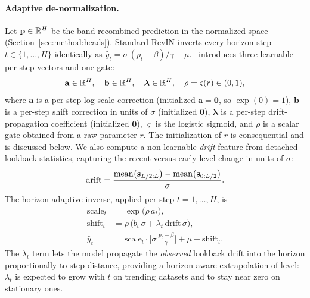 \paragraph{Adaptive de-normalization.}
Let $\mathbf{p} \in \mathbb{R}^{H}$ be the band-recombined prediction in the normalized space
(Section~\ref{sec:method:heads}). Standard RevIN inverts every horizon step
$t \in \{1,\dots,H\}$ identically as
$\hat{y}_t = \sigma\,(p_t - \beta)/\gamma + \mu$. \arevin\ introduces three
learnable per-step vectors and one gate:
\begin{equation}
\mathbf{a} \in \mathbb{R}^{H},\quad
\mathbf{b} \in \mathbb{R}^{H},\quad
\boldsymbol{\lambda} \in \mathbb{R}^{H},\quad
\rho = \varsigma(r) \in (0,1),
\label{eq:arevin-params}
\end{equation}
where $\mathbf{a}$ is a per-step log-scale correction (initialized
$\mathbf{a}{=}\mathbf{0}$, so $\exp(0){=}1$), $\mathbf{b}$ is a per-step shift
correction in units of $\sigma$ (initialized $\mathbf{0}$),
$\boldsymbol{\lambda}$ is a per-step drift-propagation coefficient (initialized
$\mathbf{0}$), $\varsigma$ is the logistic sigmoid, and $\rho$ is a scalar gate
obtained from a raw parameter $r$. The initialization of $r$ is consequential and
is discussed below. We also compute a non-learnable \emph{drift} feature from
detached lookback statistics, capturing the recent-versus-early level change in
units of $\sigma$:
\begin{equation}
\mathrm{drift} =
\frac{\operatorname{mean}\!\big(\mathbf{s}_{L/2:L}\big)
      - \operatorname{mean}\!\big(\mathbf{s}_{0:L/2}\big)}{\sigma}.
\label{eq:drift}
\end{equation}
The horizon-adaptive inverse, applied per step $t = 1,\dots,H$, is
\begin{align}
\mathrm{scale}_t &= \exp\!\big(\rho\, a_t\big), \label{eq:arevin-scale}\\
\mathrm{shift}_t &= \rho\,\big(b_t\,\sigma + \lambda_t\,\mathrm{drift}\,\sigma\big),
  \label{eq:arevin-shift}\\
\hat{y}_t &= \mathrm{scale}_t \cdot
  \Big[\sigma\,\frac{p_t - \beta}{\gamma}\Big] + \mu + \mathrm{shift}_t.
  \label{eq:arevin-denorm}
\end{align}
The $\lambda_t$ term lets the model propagate the \emph{observed} lookback drift
into the horizon proportionally to step distance, providing a horizon-aware
extrapolation of level: $\lambda_t$ is expected to grow with $t$ on trending
datasets and to stay near zero on stationary ones.

